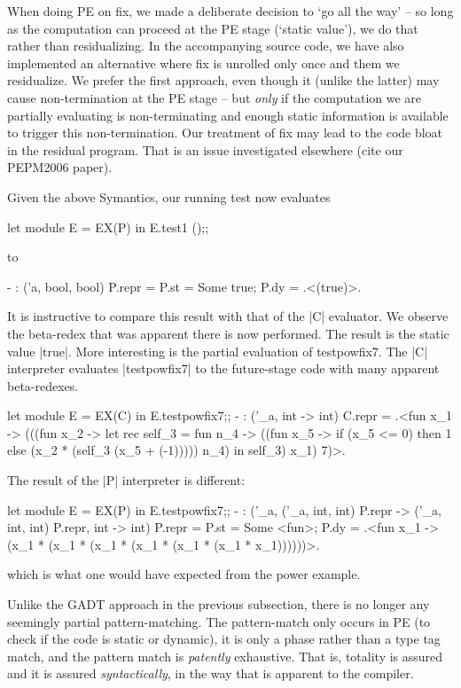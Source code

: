\documentclass[preprint]{sigplanconf}
\begin{document}
When doing PE on fix, we made a deliberate decision to `go all the
way' -- so long as the computation can proceed at the PE stage
(`static value'), we do that rather than residualizing. In the
accompanying source code, we have also implemented an alternative
where fix is unrolled only once and them we residualize. We prefer the
first approach, even though it (unlike the latter) may cause
non-termination at the PE stage -- but \emph{only} if the computation
we are partially evaluating is non-terminating and enough static
information is available to trigger this non-termination.  Our
treatment of fix may lead to the code bloat in the residual
program. That is an issue investigated elsewhere (cite our PEPM2006
paper).

Given the above Symantics, our running test now evaluates
\begin{code}
  let module E = EX(P) in E.test1 ();;
\end{code}
to
\begin{code}
- : ('a, bool, bool) P.repr = 
   {P.st = Some true; P.dy = .<(true)>.}
\end{code}
It is instructive to compare this result with that of the |C|
evaluator. We observe the beta-redex that was apparent there is now
performed. The result is the static value |true|.
More interesting is the partial evaluation of testpowfix7. The |C|
interpreter evaluates |testpowfix7| to the future-stage code with many
apparent beta-redexes.
\begin{code}
  let module E = EX(C) in E.testpowfix7;;
 - : ('_a, int -> int) C.repr =
.<fun x_1 ->
   (((fun x_2 ->
       let rec self_3 =
        fun n_4 ->
         ((fun x_5 -> if (x_5 <= 0) then 1 
                      else (x_2 * (self_3 (x_5 + (-1)))))
           n_4) in
       self_3) x_1) 7)>.
\end{code}
The result of the |P| interpreter is different:

\begin{code}
  let module E = EX(P) in E.testpowfix7;;
 - : ('_a, ('_a, int, int) P.repr -> ('_a, int, int) P.repr, 
      int -> int) P.repr = 
 {P.st = Some <fun>;
  P.dy = .<fun x_1 -> 
     (x_1 * (x_1 * (x_1 * (x_1 * (x_1 * (x_1 * x_1))))))>.}
\end{code}

which is what one would have expected from the power example.

Unlike the GADT approach in the previous subsection, there is no
longer any seemingly partial pattern-matching. The pattern-match only
occurs in PE (to check if the code is static or dynamic), it is only a
phase rather than a type tag match, and the pattern match is
\emph{patently} exhaustive. That is, totality is assured and it is
assured \emph{syntactically}, in the way that is apparent to the
compiler.
\end{document}
